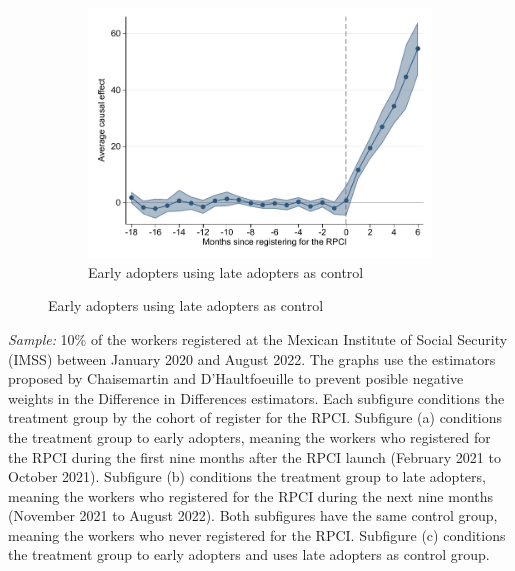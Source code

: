 \documentclass[oneside,11pt]{article}
\begin{document}
\begin{figure}[H]
\begin{center}
    \begin{subfigure}{0.49\textwidth}
    \caption{Early adopters using late adopters as control}
    \includegraphics[width=\textwidth]{04_Figures/muestra_10porciento/event_study_sal_cierre_chaisemartin_adopters_early_late.pdf}
    \end{subfigure}
    
    \end{center}
\end{figure}
\scriptsize{
\noindent \textit{Sample:} 10\% of the workers registered at the Mexican Institute of Social Security (IMSS) between January 2020 and August 2022. The graphs use the estimators proposed by Chaisemartin and D'Haultfoeuille to prevent posible negative weights in the Difference in Differences estimators. Each subfigure conditions the treatment group by the cohort of register for the RPCI. Subfigure (a) conditions the treatment group to early adopters, meaning the workers who registered for the RPCI during the first nine months after the RPCI launch (February 2021 to October 2021). Subfigure (b) conditions the treatment group to late adopters, meaning the workers who registered for the RPCI during the next nine months (November 2021 to August 2022). Both subfigures have the same control group, meaning the workers who never registered for the RPCI. Subfigure (c) conditions the treatment group to early adopters and uses late adopters as control group.
}

\clearpage
\end{document}
